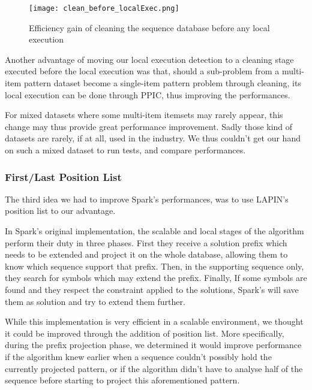 \documentclass{eplmastersthesis}
\begin{document}
\begin{figure}[h]
  \centering
  \texttt{[image: clean\_before\_localExec.png]}
  \caption{Efficiency gain of cleaning the sequence database before any local execution}
  \label{fig:cleaning_before_local_exec}
\end{figure}

Another advantage of moving our local execution detection to a cleaning stage executed before the local execution was that, should a sub-problem from a multi-item pattern dataset become a single-item pattern problem through cleaning, its local execution can be done through PPIC, thus improving the performances. \newline

For mixed datasets where some multi-item itemsets may rarely appear, this change may thus provide great performance improvement. Sadly those kind of datasets are rarely, if at all, used in the industry. We thus couldn't get our hand on such a mixed dataset to run tests, and compare performances.

\subsubsection{First/Last Position List}

The third idea we had to improve Spark's performances, was to use LAPIN's position list to our advantage. \newline

In Spark's original implementation, the scalable and local stages of the algorithm perform their duty in three phases. First they receive a solution prefix which needs to be extended and project it on the whole database, allowing them to know which sequence support that prefix. Then, in the supporting sequence only, they search for symbols which may extend the prefix. Finally, If some symbols are found and they respect the constraint applied to the solutions, Spark's will save them as solution and try to extend them further. \newline

While this implementation is very efficient in a scalable environment, we thought it could be improved through the addition of position list. More specifically, during the prefix projection phase, we determined it would improve performance if the algorithm knew earlier when a sequence couldn't possibly hold the currently projected pattern, or if the algorithm didn't have to analyse half of the sequence before starting to project this aforementioned pattern. \newline
\end{document}
